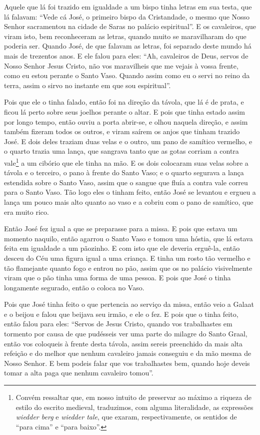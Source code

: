 Aquele que lá foi trazido em igualdade a um bispo tinha letras em sua testa, que
lá falavam: “Vede cá José, o primeiro bispo da Cristandade, o mesmo que Nosso
Senhor sacramentou na cidade de Saras no palácio espiritual”. E os cavaleiros,
que viram isto, bem reconheceram as letras, quando muito se maravilharam do que
poderia ser. Quando José, de que falavam as letras, foi separado deste mundo há
mais de trezentos anos. E ele falou para eles: “Ah, cavaleiros de Deus, servos
de Nosso Senhor Jesus Cristo, não vos maravilheis que me vejais à vossa frente,
como eu estou perante o Santo Vaso. Quando assim como eu o servi no reino da
terra, assim o sirvo no instante em que sou espiritual”. 

Pois que ele o tinha falado, então foi na direção da távola, que lá é de prata,
e ficou lá perto sobre seus joelhos perante o altar. E pois que tinha estado
assim por longo tempo, então ouviu a porta abrir-se, e olhou naquela direção, e
assim também fizeram todos os outros, e viram saírem os anjos que tinham
trazido José. E dois deles traziam duas velas e o outro, um pano de samítico
vermelho, e o quarto trazia uma lança, que sangrava tanto que as gotas corriam
a contra vale\footnote{ Convém ressaltar que, em nosso intuito de preservar ao
máximo a riqueza de estilo do escrito medieval, traduzimos, com alguma
literalidade, as expressões \textit{wiedder berg}   e \textit{wiedder tale},  que exaram,
respectivamente, os sentidos de “para cima” e “para baixo”.} a um
cibório que ele tinha na mão. E os dois colocaram suas velas sobre a távola e o
terceiro, o pano à frente do Santo Vaso; e o quarto segurava a lança estendida
sobre o Santo Vaso, assim que o sangue que fluía a contra vale correu para o
Santo Vaso. Tão logo eles o tinham feito, então José se levantou e ergueu a
lança um pouco mais alto quanto ao vaso e a cobriu com o pano de samítico, que
era muito rico. 

Então José fez igual a que se preparasse para a missa. E pois que estava um
momento naquilo, então agarrou o Santo Vaso e tomou uma hóstia, que lá estava
feita em igualdade a um pãozinho. E com isto que ele deveria erguê-la, então
desceu do Céu uma figura igual a uma criança. E tinha um rosto tão vermelho e
tão flamejante quanto fogo e entrou no pão, assim que os no palácio
visivelmente viram que o pão tinha uma forma de uma pessoa. E pois que José o
tinha longamente segurado, então o coloca no Vaso. 

Pois que José tinha feito o que pertencia ao serviço da missa, então veio a
Galaat e o beijou e falou que beijava seu irmão, e ele o fez. E pois que o
tinha feito, então falou para eles: “Servos de Jesus Cristo, quando vos
trabalhastes em tormento por causa de que pudésseis ver uma parte do milagre do
Santo Graal, então vos coloqueis à frente desta távola, assim sereis preenchido
da mais alta refeição e do melhor que nenhum cavaleiro jamais conseguiu e da
mão mesma de Nosso Senhor. E bem podeis falar que vos trabalhastes bem, quando
hoje deveis tomar a alta paga que nenhum cavaleiro tomou”.

